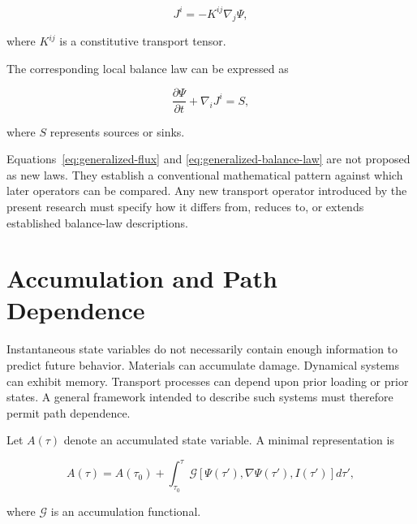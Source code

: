 \documentclass[12pt,oneside]{book}
\begin{document}
\begin{equation}
    J^i
    =
    -K^{ij}\nabla_j\Psi,
    \label{eq:generalized-flux}
\end{equation}

where \(K^{ij}\) is a constitutive transport tensor.

The corresponding local balance law can be expressed as

\begin{equation}
    \frac{\partial \Psi}{\partial t}
    +
    \nabla_i J^i
    =
    S,
    \label{eq:generalized-balance-law}
\end{equation}

where \(S\) represents sources or sinks.

Equations~\eqref{eq:generalized-flux} and
\eqref{eq:generalized-balance-law} are not proposed as new laws.
They establish a conventional mathematical pattern against
which later operators can be compared. Any new transport
operator introduced by the present research must specify how it
differs from, reduces to, or extends established balance-law
descriptions.


\section{Accumulation and Path Dependence}
\label{sec:accumulation-path-dependence}

Instantaneous state variables do not necessarily contain enough
information to predict future behavior. Materials can accumulate
damage. Dynamical systems can exhibit memory. Transport
processes can depend upon prior loading or prior states. A
general framework intended to describe such systems must
therefore permit path dependence.

Let \(A(\tau)\) denote an accumulated state variable. A minimal
representation is

\begin{equation}
    A(\tau)
    =
    A(\tau_0)
    +
    \int_{\tau_0}^{\tau}
        \mathcal{G}
        \left[
            \Psi(\tau'),
            \nabla\Psi(\tau'),
            I(\tau')
        \right]
    d\tau',
    \label{eq:general-accumulation}
\end{equation}

where \(\mathcal{G}\) is an accumulation functional.
\end{document}
